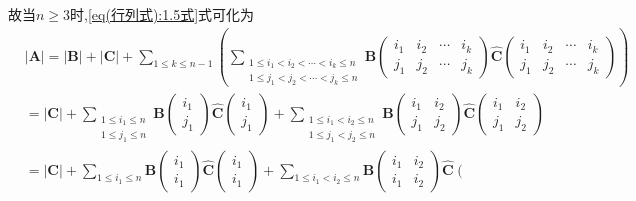 \documentclass[../../main.tex]{subfiles}
\begin{document}
\begin{solution}
\begin{enumerate}[(1)]
故当\(n\geqslant 3\)时,\eqref{eq(行列式):1.5式}式可化为
\begin{align*}
&|\boldsymbol{A}| = |\boldsymbol{B}| + |\boldsymbol{C}| + \sum_{1\leqslant k\leqslant n - 1}\left(\sum_{\substack{
1\leqslant i_1 < i_2 < \cdots < i_k\leqslant n\\
1\leqslant j_1 < j_2 < \cdots < j_k\leqslant n
}}\boldsymbol{B}\left(\begin{matrix}
i_1 & i_2 & \cdots & i_k\\
j_1 & j_2 & \cdots & j_k
\end{matrix}\right)\widehat{\boldsymbol{C}}\left(\begin{matrix}
i_1 & i_2 & \cdots & i_k\\
j_1 & j_2 & \cdots & j_k
\end{matrix}\right)\right) 
\\
&= |\boldsymbol{C}| + \sum_{\substack{
1\leqslant i_1\leqslant n\\
1\leqslant j_1\leqslant n
}}\boldsymbol{B}\left(\substack{
i_1\\
j_1
}\right)\widehat{\boldsymbol{C}}\left(\begin{array}{c}
i_1\\
j_1
\end{array}\right) + \sum_{\substack{
1\leqslant i_1 < i_2\leqslant n\\
1\leqslant j_1 < j_2\leqslant n
}}\boldsymbol{B}\left(\begin{matrix}
i_1 & i_2\\
j_1 & j_2
\end{matrix}\right)\widehat{\boldsymbol{C}}\left(\begin{matrix}
i_1 & i_2\\
j_1 & j_2
\end{matrix}\right)
\\
&= |\boldsymbol{C}| + \sum_{1\leqslant i_1\leqslant n}\boldsymbol{B}\left(\begin{array}{c}
i_1\\
i_1
\end{array}\right)\widehat{\boldsymbol{C}}\left(\begin{array}{c}
i_1\\
i_1
\end{array}\right) + \sum_{1\leqslant i_1 < i_2\leqslant n}\boldsymbol{B}\left(\begin{matrix}
i_1 & i_2\\
i_1 & i_2
\end{matrix}\right)\widehat{\boldsymbol{C}}\left(\begin{matrix}

\end{matrix}
\end{align*}
\end{enumerate}
\end{solution}
\end{document}
